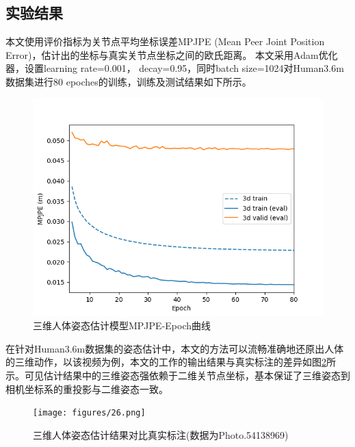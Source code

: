 \subsection{实验结果}{}
本文使用评价指标为关节点平均坐标误差MPJPE (Mean Peer Joint Position Error)，估计出的坐标与真实关节点坐标之间的欧氏距离。
本文采用Adam优化器，设置learning rate=0.001， decay=0.95，同时batch size=1024对Human3.6m数据集进行80 epoches的训练，训练及测试结果如下所示。
\begin{figure}[h]
	\centering
	\includegraphics[scale=1]{figures/25.png}
	\caption{三维人体姿态估计模型MPJPE-Epoch曲线}
	\label{fig:f25}
\end{figure}
在针对Human3.6m数据集的姿态估计中，本文的方法可以流畅准确地还原出人体的三维动作，以该视频为例，本文的工作的输出结果与真实标注的差异如图\ref{fig:f26}所示。可见估计结果中的三维姿态强依赖于二维关节点坐标，基本保证了三维姿态到相机坐标系的重投影与二维姿态一致。
\begin{figure}[h]
	\centering
	\texttt{[image: figures/26.png]}
	\caption{三维人体姿态估计结果对比真实标注(数据为Photo.54138969)}
	\label{fig:f26}
\end{figure}

